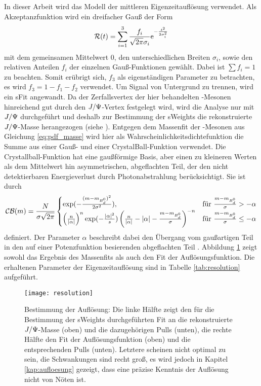 In dieser Arbeit wird das Modell der mittleren Eigenzeitauflösung verwendet. Als Akzeptanzfunktion wird ein dreifacher Gauß der Form
\begin{align}
\mathcal{R}(t) = \sum_{i=1}^{3} \frac{f_i}{\sqrt{2\pi}\sigma_i}\mathrm{e}^{-\frac{t^2}{2\sigma_i^2}}
\end{align}
mit dem gemeinsamen Mittelwert $0$, den unterschiedlichen Breiten $\sigma_i$, sowie den relativen Anteilen $f_i$ der einzelnen Gauß-Funktionen gewählt. Dabei ist $\sum f_i = 1$ zu beachten. Somit erübrigt sich, $f_3$ als eigenständigen Parameter zu betrachten, es wird $f_3 = 1 - f_1 - f_2$ verwendet. Um Signal von Untergrund zu trennen, wird ein sFit angewandt. Da der Zerfallsvertex der hier behandelten \Bd-Mesonen hinreichend gut durch den $J/\Psi$-Vertex festgelegt wird, wird die Analyse nur mit $J/\Psi$ durchgeführt und deshalb zur Bestimmung der sWeights die rekonstruierte $J/\Psi$-Masse herangezogen (siehe \cite{6}). Entgegen dem Massenfit der \Bd-Mesonen aus Gleichung \ref{eq:pdf_masse} wird hier als Wahrscheinlichkeitsdichtefunktion die Summe aus einer Gauß- und einer CrystalBall-Funktion verwendet. Die Crystallball-Funktion hat eine gaußförmige Basis, aber einen zu kleineren Werten als dem Mittelwert hin asymmetrischen, abgeflachten Teil, der den nicht detektierbaren Energieverlust durch Photonabstrahlung berücksichtigt. Sie ist durch
\begin{align}
\mathcal{CB}(m) = \frac{N}{\sigma\sqrt{2\pi}} \begin{cases} \exp(-\frac{(m-m_{\text{$B_d^0$}})^2}{2\sigma^2}), & \text{für }\frac{m-m_{\text{$B_d^0$}}}{\sigma}>-\alpha \\ \left(\frac{n}{|\alpha|}\right)^n \exp(-\frac{|\alpha|^2}{s}) \left(\frac{n}{|\alpha|}-|\alpha|-\frac{m-m_{\text{$B_d^0$}}}{\sigma}\right)^{-n} & \text{für }\frac{m-m_{\text{$B_d^0$}}}{\sigma}\leq -\alpha \end{cases} 
\end{align}
definiert. Der Parameter $\alpha$ beschreibt dabei den Übergang vom gaußartigen Teil in den auf einer Potenzfunktion besierenden abgeflachten Teil \cite{crystal_ball}. Abbildung \ref{fig:resolution} zeigt sowohl das Ergebnis des Massenfits als auch den Fit der Auflösungsfunktion. Die erhaltenen Parameter der Eigenzeitauflösung sind in Tabelle \ref{tab:resolution} aufgeführt.
\begin{figure}[hptb]
\centering
\texttt{[image: resolution]}
\caption{Bestimmung der Auflösung: Die linke Hälfte zeigt den für die Bestimmung der sWeights durchgeführten Fit an die rekonstruierte $J/\Psi$-Masse (oben) und die dazugehörigen Pulls (unten), die rechte Hälfte den Fit der Auflösungsfunktion (oben) und die entsprechenden Pulls (unten). Letztere scheinen nicht optimal zu sein, die Schwankungen sind recht groß, es wird jedoch in Kapitel \ref{kap:aufloesung} gezeigt, dass eine präzise Kenntnis der Auflösung nicht von Nöten ist.}
\label{fig:resolution}
\end{figure}
